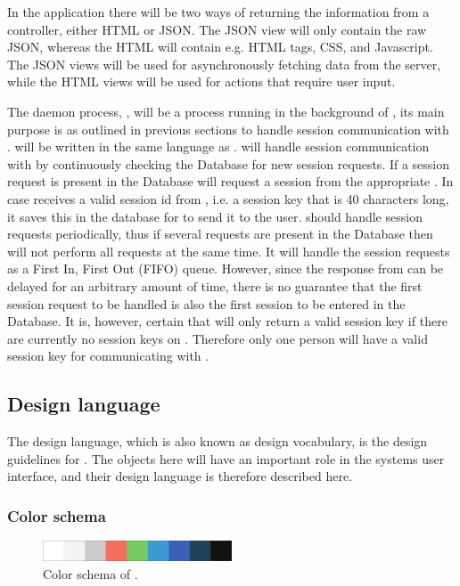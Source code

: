 In the application there will be two ways of returning the information from a controller, either HTML or JSON.
The JSON view will only contain the raw JSON, whereas the HTML will contain e.g. HTML tags, CSS, and Javascript.
The JSON views will be used for asynchronously fetching data from the server, while the HTML views will be used for actions that require user input.

The daemon process, , will be a process running in the background of , its main purpose is as outlined in previous sections to handle session communication with .
 will be written in the same language as . %
 will handle session communication with  by continuously checking the Database for new session requests.
If a session request is present in the Database  will request a session from the appropriate .
In case  receives a valid session id from , i.e. a session key that is 40 characters long, it saves this in the database for  to send it to the user.
 should handle session requests periodically, thus if several requests are present in the Database then  will not perform all requests at the same time.
It will handle the session requests as a First In, First Out (FIFO) queue.
However, since the response from  can be delayed for an arbitrary amount of time, there is no guarantee that the first session request to be handled is also the first session to be entered in the Database.
It is, however, certain that  will only return a valid session key if there are currently no session keys on .
Therefore only one person will have a valid session key for communicating with .

\subsection{Design language}
The design language, which is also known as design vocabulary, is the design guidelines for \projectname{}.
The objects here will have an important role in the systems user interface, and their design language is therefore described here.

\subsubsection{Color schema}
\begin{figure}[htb]
    \centering
    \includegraphics[width=0.5\textwidth]{gfx/color_schema.pdf}
    \caption{Color schema of \projectname{}.}
    \label{fig:color_schema}
\end{figure}

